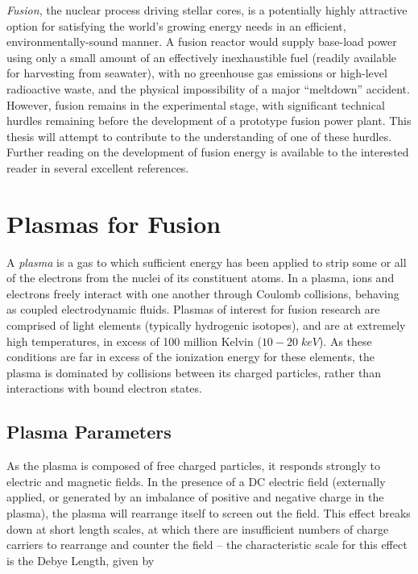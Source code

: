 \emph{Fusion}, the nuclear process driving stellar cores, is a potentially highly attractive option for satisfying the world's growing energy needs in an efficient, environmentally-sound manner.  A fusion reactor would supply base-load power using only a small amount of an effectively inexhaustible fuel (readily available for harvesting from seawater), with no greenhouse gas emissions or high-level radioactive waste, and the physical impossibility of a major ``meltdown'' accident.  However, fusion remains in the experimental stage, with significant technical hurdles remaining before the development of a prototype fusion power plant.  This thesis will attempt to contribute to the understanding of one of these hurdles.  Further reading on the development of fusion energy is available to the interested reader in several excellent references. \cite{Freidberg2007,Wesson2011,Chen1984} \nicesectionending


\section{Plasmas for Fusion}\label{sec:intro_plasmas}

A \emph{plasma} is a gas to which sufficient energy has been applied to strip some or all of the electrons from the nuclei of its constituent atoms.  In a plasma, ions and electrons freely interact with one another through Coulomb collisions, behaving as coupled electrodynamic fluids.  Plasmas of interest for fusion research are comprised of light elements (typically hydrogenic isotopes), and are at extremely high temperatures, in excess of 100 million Kelvin ($10-20 \;\si{keV}$).  As these conditions are far in excess of the ionization energy for these elements, the plasma is dominated by collisions between its charged particles, rather than interactions with bound electron states.

\subsection{Plasma Parameters}\label{subsec:intro_params}

As the plasma is composed of free charged particles, it responds strongly to electric and magnetic fields.  In the presence of a DC electric field (externally applied, or generated by an imbalance of positive and negative charge in the plasma), the plasma will rearrange itself to screen out the field.  This effect breaks down at short length scales, at which there are insufficient numbers of charge carriers to rearrange and counter the field -- the characteristic scale for this effect is the Debye Length, given by

